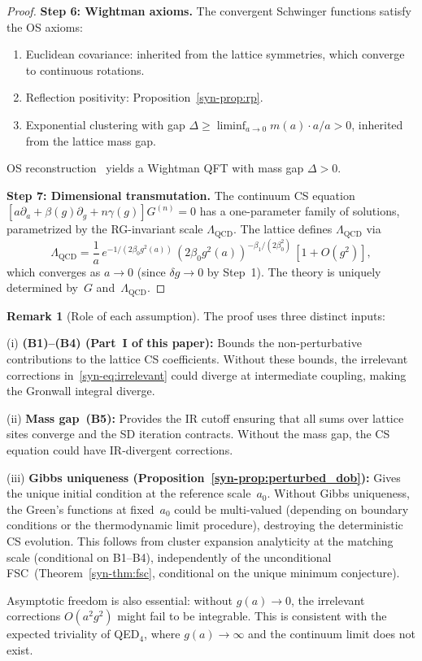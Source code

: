 \documentclass[11pt]{article}
\theoremstyle{definition}
\newtheorem{remark}[theorem]{Remark}
\begin{document}
\begin{proof}
\smallskip
\textbf{Step 6: Wightman axioms.}
The convergent Schwinger functions satisfy the OS axioms:
\begin{enumerate}[label=(\roman*),nosep]
  \item Euclidean covariance: inherited from the lattice
    symmetries, which converge to continuous rotations.
  \item Reflection positivity: Proposition~\ref{syn-prop:rp}.
  \item Exponential clustering with gap
    $\Delta \geq \liminf_{a \to 0} m(a) \cdot a /a > 0$,
    inherited from the lattice mass gap.
\end{enumerate}
OS reconstruction~\cite{OsterwalderSchrader} yields a
Wightman QFT with mass gap $\Delta > 0$.

\smallskip
\textbf{Step 7: Dimensional transmutation.}
The continuum CS equation $[a\partial_a + \beta(g)\partial_g
+ n\gamma(g)]G^{(n)} = 0$ has a one-parameter family of
solutions, parametrized by the RG-invariant scale
$\Lambda_{\mathrm{QCD}}$.  The lattice defines
$\Lambda_{\mathrm{QCD}}$ via
\begin{equation}
  \Lambda_{\mathrm{QCD}}
  = \frac{1}{a}\,e^{-1/(2\beta_0 g^2(a))}
  \,(2\beta_0 g^2(a))^{-\beta_1/(2\beta_0^2)}\,
  [1 + O(g^2)],
\end{equation}
which converges as $a \to 0$ (since $\delta g \to 0$
by Step~1).
The theory is uniquely determined by~$G$
and~$\Lambda_{\mathrm{QCD}}$.
\end{proof}

\begin{remark}[Role of each assumption]
\label{syn-rem:uniqueness_roles}
The proof uses three distinct inputs:

\smallskip\noindent
(i) \textbf{(B1)--(B4) (Part~I of this paper):}
Bounds the non-perturbative contributions to the lattice
CS coefficients.  Without these bounds, the irrelevant
corrections in~\eqref{syn-eq:irrelevant} could diverge at
intermediate coupling, making the Gronwall integral
diverge.

\smallskip\noindent
(ii) \textbf{Mass gap~(B5):} Provides the IR cutoff
ensuring that all sums over lattice sites converge and
the SD iteration contracts.  Without the mass gap, the
CS equation could have IR-divergent corrections.

\smallskip\noindent
(iii) \textbf{Gibbs uniqueness
(Proposition~\ref{syn-prop:perturbed_dob}):} Gives the
unique initial condition at the reference scale~$a_0$.
Without Gibbs uniqueness, the Green's functions at
fixed~$a_0$ could be multi-valued (depending on boundary
conditions or the thermodynamic limit procedure),
destroying the deterministic CS evolution.
This follows from cluster expansion analyticity at the matching
scale (conditional on B1--B4), independently of the
unconditional FSC~(Theorem~\ref{syn-thm:fsc},
conditional on the unique minimum conjecture).

\smallskip\noindent
Asymptotic freedom is also essential: without $g(a) \to 0$,
the irrelevant corrections $O(a^2 g^2)$ might fail to be
integrable.  This is consistent with the expected triviality
of QED$_4$, where $g(a) \to \infty$ and the continuum
limit does not exist.
\end{remark}
\end{document}
